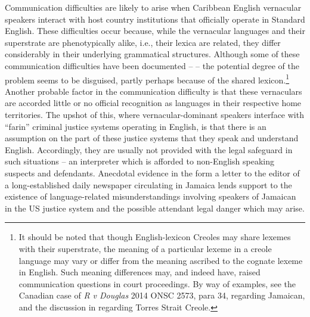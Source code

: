 \documentclass[output=paper,colorlinks,citecolor=brown]{langscibook}
\begin{document}
Communication difficulties are likely to arise when Caribbean English vernacular speakers interact with host country institutions that officially operate in Standard English. These difficulties occur because, while the vernacular languages and their superstrate are phenotypically alike, i.e., their lexica are related, they differ considerably in their underlying grammatical structures. Although some of these communication difficulties have been documented -- \citet{Brown-BlakeChambers2007} -- the potential degree of the problem seems to be disguised, partly perhaps because of the shared lexicon.\footnote{It should be noted that though English-lexicon Creoles may share lexemes with their superstrate, the meaning of a particular lexeme in a creole language may vary or differ from the meaning ascribed to the cognate lexeme in English. Such meaning differences may, and indeed have, raised communication questions in court proceedings. By way of examples, see the Canadian case of \textit{R v Douglas} 2014 ONSC 2573, para 34, regarding Jamaican, and the discussion in \citet[118]{Eades1994} regarding Torres Strait Creole.} Another probable factor in the communication difficulty is that these vernaculars are accorded little or no official recognition as languages in their respective home territories. The upshot of this, where vernacular-dominant speakers interface with “farin” criminal justice systems operating in English, is that there is an assumption on the part of these justice systems that they speak and understand English. Accordingly, they are usually not provided with the legal safeguard in such situations -- an interpreter which is afforded to non-English speaking suspects and defendants. Anecdotal evidence in the form a letter to the editor of a long-established daily newspaper \citep{Martin2002} circulating in Jamaica lends support to the existence of language-related misunderstandings involving speakers of Jamaican in the US justice system and the possible attendant legal danger which may arise.
\end{document}
